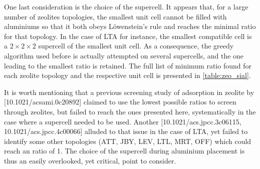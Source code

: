 \documentclass[main.tex]{subfiles}
\begin{document}
One last consideration is the choice of the supercell. It appears that, for a large number of zeolites topologies, the smallest unit cell cannot be filled with aluminiums so that it both obeys L\"owenstein's rule and reaches the minimal \SiAl ratio for that topology. In the case of LTA for instance, the smallest compatible cell is a $2\times2\times2$ supercell of the smallest unit cell. As a consequence, the greedy algorithm used before is actually attempted on several supercells, and the one leading to the smallest \SiAl ratio is retained. The full list of minimum \SiAl ratio found for each zeolite topology and the respective unit cell is presented in \cref{table:zeo_sial}.

It is worth mentioning that a previous screening study of adsorption in zeolite by [10.1021/acsami.0c20892] claimed to use the lowest possible \SiAl ratios to screen through zeolites, but failed to reach the ones presented here, systematically in the case where a supercell needed to be used. Another [10.1021/acs.jpcc.3c06115, 10.1021/acs.jpcc.4c00066] alluded to that issue in the case of LTA, yet failed to identify some other topologies (ATT, JBY, LEV, LTL, MRT, OFF) which could reach an \SiAl ratio of 1. The choice of the supercell during aluminium placement is thus an easily overlooked, yet critical, point to consider.
\end{document}
